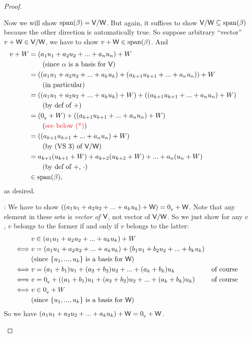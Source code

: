 \begin{proof}
\begin{enumerate}
Now we will show \(\operatorname{span}(\beta) = \textsf{V}/\textsf{W}\).
But again, it suffices to show \(\textsf{V}/\textsf{W} \subseteq \operatorname{span}(\beta)\) because the other direction is automatically true.
So suppose arbitrary ``vector'' \(v + \textsf{W} \in \textsf{V}/\textsf{W}\), we have to show \(v + \textsf{W} \in \operatorname{span}(\beta)\).
And
\begin{align*}
    v + W & = (a_1 u_1 + a_2 u_2 + ... + a_n u_n) + W \\
          & \text{\ \ \ \ \ \ (since \(\alpha\) is a basis for \(\V\))} \\
          & = ((a_1 u_1 + a_2 u_2 + ... + a_k u_k) + (a_{k + 1} u_{k + 1} + ... + a_n u_n)) + W \\
          & \text{\ \ \ \ \ \ (in particular)} \\
          & = ((a_1 u_1 + a_2 u_2 + ... + a_k u_k) + W) + ((a_{k + 1} u_{k + 1} + ... + a_n u_n) + W) \\
          & \text{\ \ \ \ \ \  (by def of \(+\))} \\
          & = (\OV + W) + ((a_{k + 1} u_{k + 1} + ... + a_n u_n) + W) \\
          & \text{\ \ \ \ \ \ (\RED{see below (*)})} \\
          & = ((a_{k + 1} u_{k + 1} + ... + a_n u_n) + W) & \\
          & \text{\ \ \ \ \ \ (by (VS 3) of \(\V/\W\))} \\
          & = a_{k + 1}(u_{k + 1} + W) + a_{k + 2}(u_{k + 2} + W) + ... + a_n(u_n + W) \\
          & \text{\ \ \ \ \ \ (by def of \(+\), \(\cdot\))} \\
          & \in \spann(\beta),
\end{align*}
as desired.

\RED{(*)}: We have to show \(((a_1 u_1 + a_2 u_2 + ... + a_k u_k) + \textsf{W}) = 0_{_{\textsf{V}}} + \textsf{W}\).
Note that any element in these sets is \emph{vector of \(\textsf{V}\)}, not vector of \(\textsf{V}/\textsf{W}\).
So we just show for any \(v\), \(v\) belongs to the former if and only if \(v\) belongs to the latter:
\begin{align*}
         & v \in (a_1 u_1 + a_2 u_2 + ... + a_k u_k) + W \\
    \iff & v = (a_1 u_1 + a_2 u_2 + ... + a_k u_k) + (b_1 u_1 + b_2 u_2 + ... + b_k u_k) \\
         & \text{(since \(\{ u_1, ..., u_k \}\) is a basis for \(\textsf{W}\))} \\
    \iff & v = (a_1 + b_1) u_1 + (a_2 + b_2) u_2 + ... + (a_k + b_k) u_k & \text{of course} \\
    \iff & v = 0_{_{\textsf{V}}} + ((a_1 + b_1) u_1 + (a_2 + b_2) u_2 + ... + (a_k + b_k) u_k) & \text{of course} \\
    \iff & v \in 0_{_{\textsf{V}}} + W \\
         & \text{(since \(\{ u_1, ..., u_k \}\) is a basis for \(\textsf{W}\))} \\
\end{align*}
So we have \((a_1 u_1 + a_2 u_2 + ... + a_k u_k) + \textsf{W} = 0_{_{\textsf{V}}} + \textsf{W}\).


\end{enumerate}
\end{proof}
